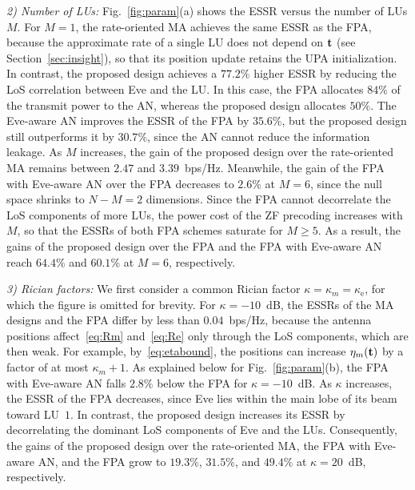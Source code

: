 \documentclass[journal]{IEEEtran}
\newcommand{\rev}[1]{{\color{red}#1}}
\newcommand{\rev}[1]{#1}
\begin{document}
\textit{2) Number of LUs:} Fig.~\ref{fig:param}(a) shows the ESSR versus the number of LUs $M$. For $M=1$, the rate-oriented MA achieves the same ESSR as the FPA, because the approximate rate of a single LU does not depend on $\mathbf{t}$ (see Section~\ref{sec:insight})\rev{, so that its position update retains the UPA initialization}. In contrast, the proposed design achieves a $77.2\%$ higher ESSR by reducing the LoS correlation between Eve and the LU. In this case, the FPA allocates $84\%$ of the transmit power to the AN, whereas the proposed design allocates $50\%$. The Eve-aware AN improves the ESSR of the FPA by $35.6\%$, but the proposed design still outperforms it by $30.7\%$, since the AN cannot reduce the information leakage. As $M$ increases, the gain of the proposed design over the rate-oriented MA remains between $2.47$ and $3.39$~bps/Hz. Meanwhile, the gain of the FPA with Eve-aware AN over the FPA decreases to $2.6\%$ at $M=6$, since the null space shrinks to $N-M=2$ dimensions. Since the FPA cannot decorrelate the LoS components of more LUs, the power cost of the ZF precoding increases with $M$, so that the ESSRs of both FPA schemes saturate for $M\ge5$. As a result, the gains of the proposed design over the FPA and the FPA with Eve-aware AN reach $64.4\%$ and $60.1\%$ at $M=6$, respectively.

\textit{3) Rician factors:} We first consider a common Rician factor $\kappa=\kappa_m=\kappa_{\mathrm e}$, for which the figure is omitted for brevity. For $\kappa=-10$~dB, the ESSRs of the MA designs and the FPA differ by less than $0.04$~bps/Hz, because the antenna positions affect~\eqref{eq:Rm} and~\eqref{eq:Re} only through the LoS components, which are then weak. For example, by~\eqref{eq:etabound}, the positions can increase $\eta_m(\mathbf{t})$ by a factor of at most $\kappa_m+1$. \rev{As explained below for Fig.~\ref{fig:param}(b), the FPA with Eve-aware AN falls $2.8\%$ below the FPA for $\kappa=-10$~dB.} As $\kappa$ increases, the ESSR of the FPA decreases, since Eve lies within the main lobe of its beam toward LU~$1$. In contrast, the proposed design increases its ESSR by decorrelating the dominant LoS components of Eve and the LUs. Consequently, the gains of the proposed design over the rate-oriented MA, the FPA with Eve-aware AN, and the FPA grow to $19.3\%$, $31.5\%$, and $49.4\%$ at $\kappa=20$~dB, respectively.
\end{document}
